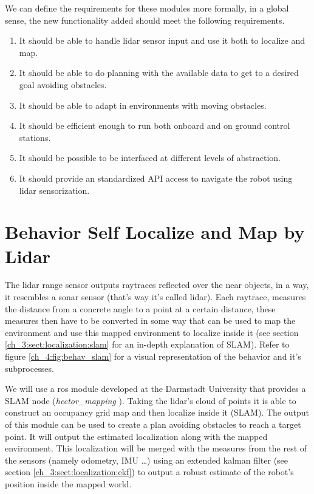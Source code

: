   \pagebreak

  We can define the requirements for these modules more formally, in a global sense, the new functionality added should meet the following requirements.
  
  \begin{enumerate}
    \item It should be able to handle lidar sensor input and use it both to localize and map.
    \item It should be able to do planning with the available data to get to a desired goal avoiding obstacles.
    \item It should be able to adapt in environments with moving obstacles.
    \item It should be efficient enough to run both onboard and on ground control stations.
    \item It should be possible to be interfaced at different levels of abstraction.
    \item It should provide an standardized API access to navigate the robot using lidar sensorization.
  \end{enumerate}

\section{Behavior Self Localize and Map by Lidar} \label{ch_4:sect:behav_slam}

  The lidar range sensor outputs raytraces reflected over the near objects, in a way, it resembles a sonar sensor (that's way it's called lidar). Each raytrace, measures the distance from a concrete angle to a point at a certain distance, these measures then have to be converted in some way that can be used to map the environment and use this mapped environment to localize inside it (see section \ref{ch_3:sect:localization:slam} for an in-depth explanation of SLAM). Refer to figure \ref{ch_4:fig:behav_slam} for a visual representation of the behavior and it's subprocesses.

  We will use a ros module developed at the Darmstadt University that provides a SLAM node (\textit{hector\_mapping} \cite{hector_slam}). Taking the lidar's cloud of points it is able to construct an occupancy grid map and then localize inside it (SLAM). The output of this module can be used to create a plan avoiding obstacles to reach a target point. It will output the estimated localization along with the mapped environment. This localization will be merged with the measures from the rest of the sensors (namely odometry, IMU \dots) using an extended kalman filter (see section \ref{ch_3:sect:localization:ekf}) to output a robust estimate of the robot's position inside the mapped world. 

